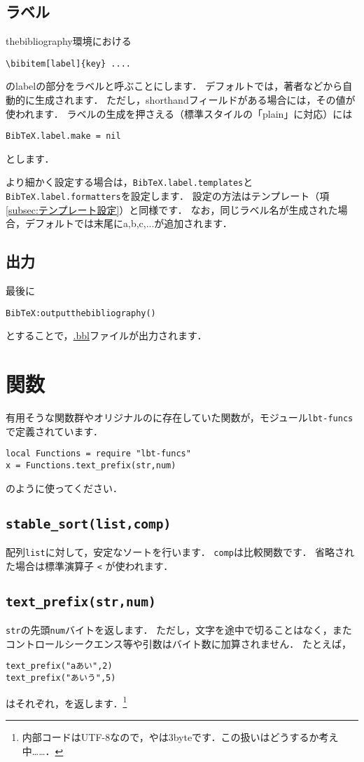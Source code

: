 \documentclass[a4paper]{ltjsarticle}
\newcommand{\luafunc}[1]{\texttt{#1}}
\newcommand*{\luavar}[1]{\texttt{#1}}
\begin{document}
\subsection{ラベル}
thebibliography環境における
\begin{lstlisting}[language={[latex]TeX}]
\bibitem[label]{key} ....
\end{lstlisting}
のlabelの部分をラベルと呼ぶことにします．
デフォルトでは，著者などから自動的に生成されます．
ただし，shorthandフィールドがある場合には，その値が使われます．
ラベルの生成を押さえる（標準スタイルの「plain」に対応）には
\begin{lstlisting}
BibTeX.label.make = nil
\end{lstlisting}
とします．

より細かく設定する場合は，\luavar{BibTeX.label.templates}と\luavar{BibTeX.label.formatters}を設定します．
設定の方法はテンプレート（項\ref{subsec:テンプレート設定}）と同様です．
なお，同じラベル名が生成された場合，デフォルトでは末尾にa,b,c,...が追加されます．

\subsection{出力}
最後に
\begin{lstlisting}
BibTeX:outputthebibliography()
\end{lstlisting}
とすることで，\url{.bbl}ファイルが出力されます．

\section{関数}\label{sec:関数}
有用そうな関数群やオリジナルの\BibTeX に存在していた関数が，モジュール\luavar{lbt-funcs}で定義されています．
\begin{lstlisting}
local Functions = require "lbt-funcs"
x = Functions.text_prefix(str,num)
\end{lstlisting}
のように使ってください．

\subsection{\luafunc{stable\_sort(list,comp)}}
配列\luavar{list}に対して，安定なソートを行います．
\luavar{comp}は比較関数です．
省略された場合は標準演算子 \luafunc{<} が使われます．

\subsection{\luafunc{text\_prefix(str,num)}}
\luavar{str}の先頭\luavar{num}バイトを返します．
ただし，文字を途中で切ることはなく，またコントロールシークエンス等や引数はバイト数に加算されません．
たとえば，
\begin{lstlisting}
text_prefix("aあい",2)
text_prefix("あいう",5)
\end{lstlisting}
はそれぞれ，を返します．\footnote{内部コードはUTF-8なので，やは3byteです．この扱いはどうするか考え中……．}
\end{document}
